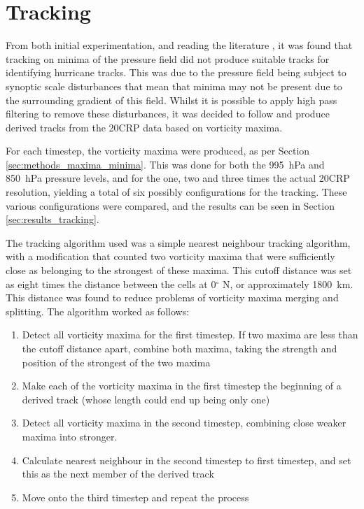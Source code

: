 \documentclass[pdftex,12pt,a4paper]{report}
\renewcommand{\textdegree}{$^{\circ}$ } %
\begin{document}
\section{Tracking}

From both initial experimentation, and reading the literature \parencite{TODOmultiple}, it was found that tracking on minima of the pressure field did not produce suitable tracks for identifying hurricane tracks. This was due to the pressure field being subject to synoptic scale disturbances that mean that minima may not be present due to the surrounding gradient of this field. Whilst it is possible to apply high pass filtering to remove these disturbances, it was decided to follow \textcite{TODOmutliple} and produce derived tracks from the 20CRP data based on vorticity maxima.

For each timestep, the vorticity maxima were produced, as per Section \ref{sec:methods_maxima_minima}. This was done for both the \SI{995}{hPa} and \SI{850}{hPa} pressure levels, and for the one, two and three times the actual 20CRP resolution, yielding a total of six possibly configurations for the tracking. These various configurations were compared, and the results can be seen in Section \ref{sec:results_tracking}.

The tracking algorithm used was a simple nearest neighbour tracking algorithm, with a modification that counted two vorticity maxima that were sufficiently close as belonging to the strongest of these maxima. This cutoff distance was set as eight times the distance between the cells at 0\textdegree N, or approximately \SI{1800}{km}. This distance was found to reduce problems of vorticity maxima merging and splitting. The algorithm worked as follows:

\begin{enumerate}
    \item Detect all vorticity maxima for the first timestep. If two maxima are less than the cutoff distance apart, combine both maxima, taking the strength and position of the strongest of the two maxima
    \item Make each of the vorticity maxima in the first timestep the beginning of a derived track (whose length could end up being only one)
    \item Detect all vorticity maxima in the second timestep, combining close weaker maxima into stronger.
    \item Calculate nearest neighbour in the second timestep to first timestep, and set this as the next member of the derived track
    \item Move onto the third timestep and repeat the process
\end{enumerate}
\end{document}
